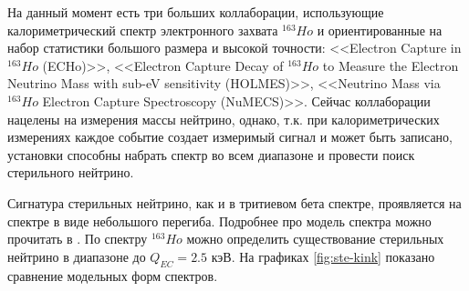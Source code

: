 \documentclass[a4paper,14pt]{extreport}
\begin{document}
На данный момент есть три больших коллаборации, использующие калориметрический спектр электронного захвата  $ ^{163}Ho $ и ориентированные на набор статистики большого размера и высокой точности: <<Electron Capture in  $ ^{163}Ho $ (ECHo)>>\cite{1309.5214}, <<Electron Capture Decay of  $ ^{163}Ho $ to Measure the Electron Neutrino Mass with sub-eV sensitivity (HOLMES)>>\cite{1412.5060}, <<Neutrino Mass via  $ ^{163}Ho $ Electron Capture Spectroscopy (NuMECS)>>\cite{numex-position-paper}. Сейчас коллаборации нацелены на измерения массы нейтрино, однако, т.к. при калориметрических измерениях каждое событие создает измеримый сигнал и может быть записано, установки способны набрать спектр во всем диапазоне и провести поиск стерильного нейтрино.

Сигнатура стерильных нейтрино, как и в тритиевом бета спектре, проявляется на спектре в виде небольшого перегиба. Подробнее про модель спектра можно прочитать в \cite{dm-kev-sterile-neutrino-whitepaper}. По спектру $ ^{163}Ho $ можно определить существование стерильных нейтрино в диапазоне до $ Q_{E C} = 2.5 $ кэВ. На графиках \ref{fig:ste-kink} показано сравнение модельных форм спектров.
\end{document}
